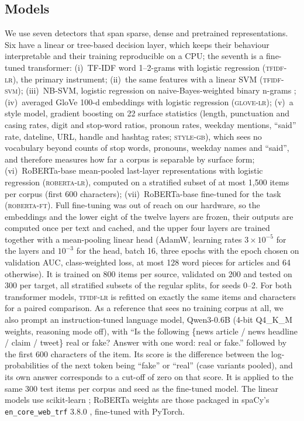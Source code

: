 \subsection{Models}\label{sec:models}
We use seven detectors that span sparse, dense and pretrained representations. Six have a linear or tree-based decision layer, which keeps their behaviour interpretable and their training reproducible on a CPU; the seventh is a fine-tuned transformer:
(i)~TF-IDF word 1--2-grams with logistic regression (\textsc{tfidf-lr}), the primary instrument;
(ii)~the same features with a linear SVM (\textsc{tfidf-svm});
(iii)~NB-SVM, logistic regression on naive-Bayes-weighted binary n-grams \citep{wang2012nbsvm};
(iv)~averaged GloVe 100-d embeddings \citep{pennington2014glove} with logistic regression (\textsc{glove-lr});
(v)~a style model, gradient boosting on 22 surface statistics (length, punctuation and casing rates, digit and stop-word ratios, pronoun rates, weekday mentions, ``said'' rate, dateline, URL, handle and hashtag rates; \textsc{style-gb}), which sees no vocabulary beyond counts of stop words, pronouns, weekday names and ``said'', and therefore measures how far a corpus is separable by surface form;
(vi)~RoBERTa-base \citep{liu2019roberta} mean-pooled last-layer representations with logistic regression (\textsc{roberta-lr}), computed on a stratified subset of at most 1{,}500 items per corpus (first 600 characters);
(vii)~RoBERTa-base fine-tuned for the task (\textsc{roberta-ft}). Full fine-tuning was out of reach on our hardware, so the embeddings and the lower eight of the twelve layers are frozen, their outputs are computed once per text and cached, and the upper four layers are trained together with a mean-pooling linear head (AdamW, learning rates $3\times10^{-5}$ for the layers and $10^{-3}$ for the head, batch 16, three epochs with the epoch chosen on validation AUC, class-weighted loss, at most 128 word pieces for articles and 64 otherwise). It is trained on 800 items per source, validated on 200 and tested on 300 per target, all stratified subsets of the regular splits, for seeds 0--2.
For both transformer models, \textsc{tfidf-lr} is refitted on exactly the same items and characters for a paired comparison.
As a reference that sees no training corpus at all, we also prompt an instruction-tuned language model, Qwen3-0.6B \citep{yang2025qwen3} (4-bit Q4\_K\_M weights, reasoning mode off), with ``Is the following \{news article / news headline / claim / tweet\} real or fake? Answer with one word: real or fake.'' followed by the first 600 characters of the item. Its score is the difference between the log-probabilities of the next token being ``fake'' or ``real'' (case variants pooled), and its own answer corresponds to a cut-off of zero on that score. It is applied to the same 300 test items per corpus and seed as the fine-tuned model. The linear models use scikit-learn \citep{pedregosa2011sklearn}; RoBERTa weights are those packaged in spaCy's \texttt{en\_core\_web\_trf} 3.8.0 \citep{honnibal2020spacy}, fine-tuned with PyTorch.

